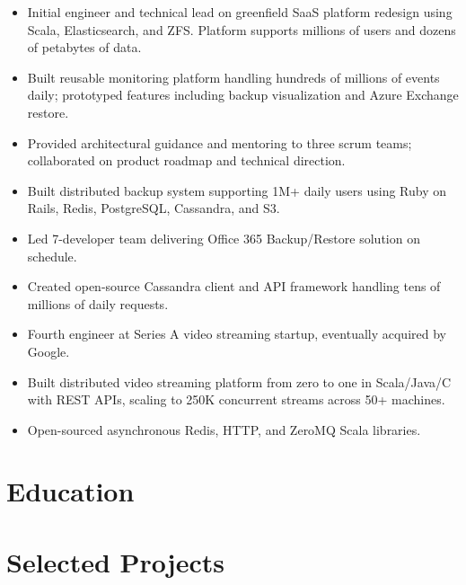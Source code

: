\documentclass[11pt,a4paper,sans]{moderncv}
\begin{document}
{ \begin{itemize} \itemsep -2pt
  \item Initial engineer and technical lead on greenfield SaaS platform redesign using Scala, Elasticsearch, and ZFS. Platform supports millions of users and dozens of petabytes of data.
  \item Built reusable monitoring platform handling hundreds of millions of events daily; prototyped features including backup visualization and Azure Exchange restore.
  \item Provided architectural guidance and mentoring to three scrum teams; collaborated on product roadmap and technical direction.
 \end{itemize} }

{ \begin{itemize} \itemsep -2pt
  \item Built distributed backup system supporting 1M+ daily users using Ruby on Rails, Redis, PostgreSQL, Cassandra, and S3.
  \item Led 7-developer team delivering Office 365 Backup/Restore solution on schedule.
  \item Created open-source Cassandra client and API framework handling tens of millions of daily requests.
\end{itemize} }

{ \begin{itemize} \itemsep -2pt
  \item Fourth engineer at Series A video streaming startup, eventually acquired by Google.
  \item Built distributed video streaming platform from zero to one in Scala/Java/C with REST APIs, scaling to 250K concurrent streams across 50+ machines.
  \item Open-sourced asynchronous Redis, HTTP, and ZeroMQ Scala libraries.
\end{itemize} }


\section{\textbf{Education}}

\section{\textbf{Selected Projects}}
\end{document}

